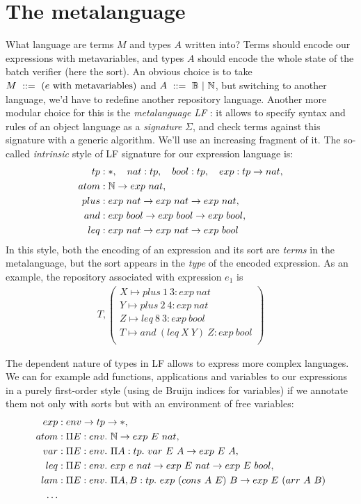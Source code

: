 \documentclass[9pt,authoryear]{sigplanconf}
\begin{document}
\section{The metalanguage}

What language are terms $M$ and types $A$ written into? Terms should
encode our expressions with metavariables, and types $A$ should encode
the whole state of the batch verifier (here the sort). An obvious
choice is to take $M\ ::=\ (e \text{ with metavariables})$ and $A\ ::=\ 
\mathbb B\ |\ \mathbb N$, but switching to another language, we'd have to
redefine another repository language. Another more modular choice for
this is the \emph{metalanguage} \emph{LF} \cite{harper1993framework}: it allows
to specify syntax and rules of an object language as a
\emph{signature} $\Sigma$, and check terms against this signature with
a generic algorithm. We'll use an increasing fragment of it. The
so-called \emph{intrinsic} style of LF signature for our expression
language is:
\begin{align*}
  tp &: \mathsf{*},\quad nat : tp,\quad bool : tp,\quad exp : tp\to nat,\\
  atom &: \mathbb N\to exp\ nat,\\
  plus &: exp\ nat \to exp\ nat \to exp\ nat,\\
  and &: exp\ bool\to exp\ bool\to exp\ bool,\\
  leq &: exp\ nat\to exp\ nat\to exp\ bool
\end{align*}
In this style, both the encoding of an expression and its sort are
\emph{terms} in the metalanguage, but the sort appears in the
\emph{type} of the encoded expression. As an example, the repository
associated with expression $e_1$ is
\begin{align*}
  T, \left(
  \begin{array}{l}
  X \mapsto plus\ 1\ 3 : exp\ nat \\
  Y \mapsto plus\ 2\ 4 : exp\ nat \\
  Z \mapsto leq\ 8\ 3 : exp\ bool \\
  T \mapsto and\ (leq\ X\ Y)\ Z : exp\ bool \\
\end{array}\right)
\end{align*}

The dependent nature of types in LF allows to express more complex
languages. We can for example add functions, applications and
variables to our expressions in a purely first-order style (using de
Bruijn indices for variables) if we annotate them not only with sorts
but with an environment of free variables:
\begin{align*}
  exp &: env\to tp\to \mathsf{*},\\
  atom &: \Pi{E}:{env}.\  \mathbb N\to exp\ E\ nat,\\
  var &: \Pi{E}:{env}.\  \Pi{A}:{tp}.\  var\ E\ A \to exp\ E\ A,\\
  leq &: \Pi{E}:{env}.\  exp\ e\ nat\to exp\ E\ nat\to exp\ E\ bool, \\
  lam &: \Pi{E}:{env}.\  \Pi{A, B}:{tp}.\  exp\ (cons\ A\ E)\ B \to
  exp\ E\ (arr\ A\ B)\\
  \ldots
\end{align*}
\end{document}
